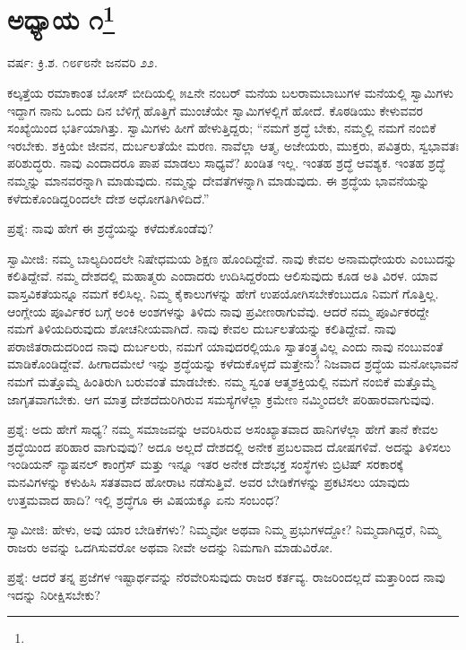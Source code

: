 
\chapter[ಅಧ್ಯಾಯ ೧]{ಅಧ್ಯಾಯ ೧\protect\footnote{}}

\begin{center}
ವರ್ಷ: ಕ್ರಿ.ಶ. ೧೮೯೮ನೇ ಜನವರಿ ೨೨.
\end{center}

ಕಲ್ಕತ್ತೆಯ ರಮಾಕಾಂತ ಬೋಸ್ ಬೀದಿಯಲ್ಲಿ ೫೭ನೇ ನಂಬರ್‌ ಮನೆಯ ಬಲರಾಮಬಾಬುಗಳ ಮನೆಯಲ್ಲಿ ಸ್ವಾಮಿಗಳು ಇದ್ದಾಗ ನಾನು ಒಂದು ದಿನ ಬೆಳಿಗ್ಗೆ ಹೊತ್ತಿಗೆ ಮುಂಚೆಯೇ ಸ್ವಾಮಿಗಳಲ್ಲಿಗೆ ಹೋದೆ. ಕೊಠಡಿಯು ಕೇಳುವವರ ಸಂಖ್ಯೆಯಿಂದ ಭರ್ತಿಯಾಗಿತ್ತು. ಸ್ವಾಮಿಗಳು ಹೀಗೆ ಹೇಳುತ್ತಿದ್ದರು; “ನಮಗೆ ಶ್ರದ್ಧೆ ಬೇಕು, ನಮ್ಮಲ್ಲಿ ನಮಗೆ ನಂಬಿಕೆ ಇರಬೇಕು. ಶಕ್ತಿಯೇ ಜೀವನ, ದುರ್ಬಲತೆಯೇ ಮರಣ. ನಾವೆಲ್ಲಾ ಆತ್ಮ, ಅಜೇಯರು, ಮುಕ್ತರು, ಪವಿತ್ರರು, ಸ್ವಭಾವತಃ ಪರಿಶುದ್ಧರು. ನಾವು ಎಂದಾದರೂ ಪಾಪ ಮಾಡಲು ಸಾಧ್ಯವೆ? ಖಂಡಿತ ಇಲ್ಲ. ಇಂತಹ ಶ್ರದ್ಧೆ ಆವಶ್ಯಕ. ಇಂತಹ ಶ್ರದ್ಧೆ ನಮ್ಮನ್ನು ಮಾನವರನ್ನಾಗಿ ಮಾಡುವುದು. ನಮ್ಮನ್ನು ದೇವತೆಗಳನ್ನಾಗಿ ಮಾಡುವುದು. ಈ ಶ್ರದ್ಧೆಯ ಭಾವನೆಯನ್ನು ಕಳೆದುಕೊಂಡಿದ್ದರಿಂದಲೇ ದೇಶ ಅಧೋಗತಿಗಿಳಿದಿದೆ.”

ಪ್ರಶ್ನೆ: ನಾವು ಹೇಗೆ ಈ ಶ್ರದ್ಧೆಯನ್ನು ಕಳೆದುಕೊಂಡೆವು?

ಸ್ವಾಮೀಜಿ: ನಮ್ಮ ಬಾಲ್ಯದಿಂದಲೇ ನಿಷೇಧಮಯ ಶಿಕ್ಷಣ ಹೊಂದಿದ್ದೇವೆ. ನಾವು ಕೇವಲ ಅನಾಮಧೇಯರು ಎಂಬುದನ್ನು ಕಲಿತಿದ್ದೇವೆ. ನಮ್ಮ ದೇಶದಲ್ಲಿ ಮಹಾತ್ಮರು ಎಂದಾದರು ಉದಿಸಿದ್ದರೆಂದು ಆಲಿಸುವುದು ಕೂಡ ಅತಿ ವಿರಳ. ಯಾವ ವಾಸ್ತವಿಕತೆಯನ್ನೂ ನಮಗೆ ಕಲಿಸಿಲ್ಲ. ನಿಮ್ಮ ಕೈಕಾಲುಗಳನ್ನು ಹೇಗೆ ಉಪಯೋಗಿಸಬೇಕೆಂಬುದೂ ನಿಮಗೆ ಗೊತ್ತಿಲ್ಲ. ಆಂಗ್ಲೇಯ ಪೂರ್ವಿಕರ ಬಗ್ಗೆ ಅಂಕಿ ಅಂಶಗಳನ್ನು ತಿಳಿದು ನಾವು ಪ್ರವೀಣರಾಗುವೆವು. ಆದರೆ ನಮ್ಮ ಪೂರ್ವಿಕರದ್ದೇ ನಮಗೆ ತಿಳಿಯದಿರುವುದು ಶೋಚನೀಯವಾಗಿದೆ. ನಾವು ಕೇವಲ ದುರ್ಬಲತೆಯನ್ನು ಕಲಿತಿದ್ದೇವೆ. ನಾವು ಪರಾಜಿತರಾದುದರಿಂದ ನಾವು ದುರ್ಬಲರು, ನಮಗೆ ಯಾವುದರಲ್ಲಿಯೂ ಸ್ವಾತಂತ್ರ್ಯವಿಲ್ಲ ಎಂದು ನಾವು ನಂಬುವಂತೆ ಮಾಡಿಕೊಂಡಿದ್ದೇವೆ. ಹೀಗಾದಮೇಲೆ ಇನ್ನು ಶ್ರದ್ಧೆಯನ್ನು ಕಳೆದುಕೊಳ್ಳದೆ ಮತ್ತೇನು? ನಿಜವಾದ ಶ್ರದ್ಧೆಯ ಮನೋಭಾವನೆ ನಮಗೆ ಮತ್ತೊಮ್ಮೆ ಹಿಂತಿರುಗಿ ಬರುವಂತೆ ಮಾಡಬೇಕು. ನಮ್ಮ ಸ್ವಂತ ಆತ್ಮಶಕ್ತಿಯಲ್ಲಿ ನಮಗೆ ನಂಬಿಕೆ ಮತ್ತೊಮ್ಮೆ ಜಾಗೃತವಾಗಬೇಕು. ಆಗ ಮಾತ್ರ ದೇಶದೆದುರಿಗಿರುವ ಸಮಸ್ಯೆಗಳೆಲ್ಲಾ ಕ್ರಮೇಣ ನಮ್ಮಿಂದಲೇ ಪರಿಹಾರವಾಗುವುವು.

ಪ್ರಶ್ನೆ: ಅದು ಹೇಗೆ ಸಾಧ್ಯ? ನಮ್ಮ ಸಮಾಜವನ್ನು ಆವರಿಸಿರುವ ಅಸಂಖ್ಯಾತವಾದ ಹಾನಿಗಳೆಲ್ಲಾ ಹೇಗೆ ತಾನೆ ಕೇವಲ ಶ್ರದ್ಧೆಯಿಂದ ಪರಿಹಾರ ವಾಗುವುವು? ಅದೂ ಅಲ್ಲದೆ ದೇಶದಲ್ಲಿ ಅನೇಕ ಪ್ರಬಲವಾದ ದೋಷಗಳಿವೆ. ಅದನ್ನು ತಿಳಿಸಲು ಇಂಡಿಯನ್ ನ್ಯಾಷನಲ್ ಕಾಂಗ್ರೆಸ್ ಮತ್ತು ಇನ್ನೂ ಇತರ ಅನೇಕ ದೇಶಭಕ್ತ ಸಂಸ್ಥೆಗಳು ಬ್ರಿಟಿಷ್ ಸರಕಾರಕ್ಕೆ ಮನವಿಗಳನ್ನು ಕಳುಹಿಸಿ ಸತತವಾದ ಹೋರಾಟ ನಡೆಸುತ್ತಿವೆ. ಅವರ ಬೇಡಿಕೆಗಳನ್ನು ಪ್ರಕಟಿಸಲು ಯಾವುದು ಉತ್ತಮವಾದ ಹಾದಿ? ಇಲ್ಲಿ ಶ್ರದ್ಧೆಗೂ ಈ ವಿಷಯಕ್ಕೂ ಏನು ಸಂಬಂಧ?

ಸ್ವಾಮೀಜಿ: ಹೇಳು, ಅವು ಯಾರ ಬೇಡಿಕೆಗಳು? ನಿಮ್ಮವೋ ಅಥವಾ ನಿಮ್ಮ ಪ್ರಭುಗಳದ್ದೋ? ನಿಮ್ಮದಾಗಿದ್ದರೆ, ನಿಮ್ಮ ರಾಜರು ಅವನ್ನು ಒದಗಿಸುವರೋ ಅಥವಾ ನೀವೇ ಅದನ್ನು ನಿಮಗಾಗಿ ಮಾಡುವಿರೋ.

ಪ್ರಶ್ನೆ: ಆದರೆ ತನ್ನ ಪ್ರಜೆಗಳ ಇಷ್ಟಾರ್ಥವನ್ನು ನೆರವೇರಿಸುವುದು ರಾಜರ ಕರ್ತವ್ಯ. ರಾಜರಿಂದಲ್ಲದೆ ಮತ್ತಾರಿಂದ ನಾವು ಇದನ್ನು ನಿರೀಕ್ಷಿಸಬೇಕು?


